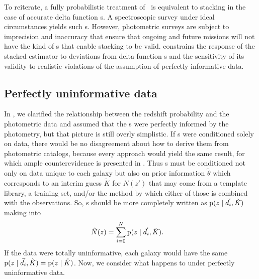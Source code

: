 
To reiterate, a fully probabilistic treatment of \Nz\ is equivalent to stacking in the case of accurate delta function \pzpdf s.
A spectroscopic survey under ideal circumstances yields such \pzpdf s.
However, photometric surveys are subject to imprecision and inaccuracy that ensure that ongoing and future missions will not have the kind of \pzpdf s that enable stacking to be valid.
 constrains the response of the stacked estimator to deviations from delta function \pzpdf s and the sensitivity of its validity to realistic violations of the assumption of perfectly informative data.


\subsection{Perfectly uninformative data}

In , we clarified the relationship between the redshift probability and the photometric data and assumed that the \pzpdf s were perfectly informed by the photometry, but that picture is still overly simplistic.
If \pzpdf s were conditioned solely on data, there would be no disagreement about how to derive them from photometric catalogs, because every approach would yield the same result, for which ample counterevidence is presented in .
Thus \pzpdf s must be conditioned not only on data unique to each galaxy but also on prior information $\tilde{\theta}$ which corresponds to an interim guess $\tilde{K}$ for $N(z')$ that may come from a template library, a training set, and/or the method by which either of those is combined with the observations.
So, \pzpdf s should be more completely written as $\mathrm{p}(z \mid \vec{d}_{i}, \tilde{K})$ making  into
\begin{align}
\eqlabel{eqn:stackwithprior}
\hat{N}(z) &= \sum_{i = 0}^{N} \pr{z \gvn \data_{i}, \tilde{K}} .
\end{align}
If the data were totally uninformative, each galaxy would have the same $\mathrm{p}(z \mid \vec{d}_{i}, \tilde{K}) = \mathrm{p}(z \mid \tilde{K})$.
Now, we consider what happens to  under perfectly uninformative data.

